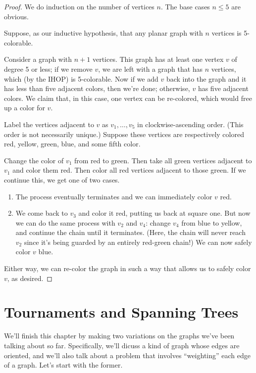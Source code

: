 \documentclass[../m055main.tex]{subfiles}
\begin{document}
\begin{proof}
    We do induction on the number of vertices $n$.
    The base cases $n \leq 5$ are obvious.

    Suppose, as our inductive hypothesis, that any planar graph with $n$ vertices is 5-colorable.

    Consider a graph with $n+1$ vertices.
    This graph has at least one vertex $v$ of degree 5 or less; if we remove $v$, we are left with a graph that has $n$ vertices, which (by the IHOP) is 5-colorable.
    Now if we add $v$ back into the graph and it has less than five adjacent colors, then we're done; otherwise, $v$ has five adjacent colors.
    We claim that, in this case, one vertex can be re-colored, which would free up a color for $v$.

    Label the vertices adjacent to $v$ as $v_1, \ldots, v_5$ in clockwise-ascending order.
    (This order is not necessarily unique.)
    Suppose these vertices are respectively colored red, yellow, green, blue, and some fifth color.

    Change the color of $v_1$ from red to green.
    Then take all green vertices adjacent to $v_1$ and color them red.
    Then color all red vertices adjacent to those green.
    If we continue this, we get one of two cases.
    \begin{enumerate}[label=(\alph*)]
        \item The process eventually terminates and we can immediately color $v$ red.
        \item We come back to $v_3$ and color it red, putting us back at square one.
        But now we can do the same process with $v_2$ and $v_4$: change $v_4$ from blue to yellow, and continue the chain until it terminates.
        (Here, the chain will never reach $v_2$ since it's being guarded by an entirely red-green chain!)
        We can now safely color $v$ blue.
    \end{enumerate}
    Either way, we can re-color the graph in such a way that allows us to safely color $v$, as desired.
\end{proof}

\section{Tournaments and Spanning Trees}
We'll finish this chapter by making two variations on the graphs we've been talking about so far.
Specifically, we'll dicuss a kind of graph whose edges are oriented, and we'll also talk about a problem that involves ``weighting'' each edge of a graph.
Let's start with the former.
\end{document}
